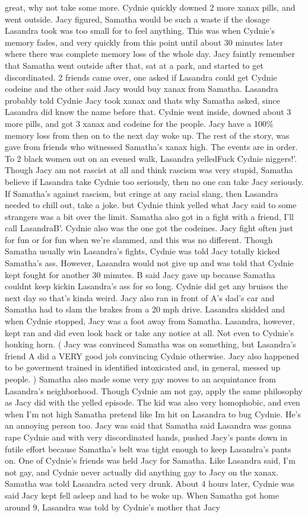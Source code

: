 \documentclass[12pt]{book}
\begin{document}
great, why not take some more. Cydnie quickly downed 2 more xanax pills, and went outside. Jacy figured, Samatha would be such a waste if the dosage Lasandra took was too small for to feel anything. This was when Cydnie's memory fades, and very quickly from this point until about 30 minutes later where there was complete memory loss of the whole day. Jacy faintly remember that Samatha went outside after that, sat at a park, and started to get discordinated. 2 friends came over, one asked if Lasandra could get Cydnie codeine and the other said Jacy would buy xanax from Samatha. Lasandra probably told Cydnie Jacy took xanax and thats why Samatha asked, since Lasandra did know the name before that. Cydnie went inside, downed about 3 more pills, and got 3 xanax and codeine for the people. Jacy have a 100\% memory loss from then on to the next day woke up. The rest of the story, was gave from friends who witnessed Samatha's xanax high. The events are in order. To 2 black women out on an evened walk, Lasandra yelledFuck Cydnie niggers!'. Though Jacy am not rascist at all and think rascism was very stupid, Samatha believe if Lasandra take Cydnie too seriously, then no one can take Jacy seriously. If Samatha's against rascism, but cringe at any racial slang, then Lasandra needed to chill out, take a joke. but Cydnie think yelled what Jacy said to some strangers was a bit over the limit. Samatha also got in a fight with a friend, I'll call LasandraB'. Cydnie also was the one got the codeines. Jacy fight often just for fun or for fun when we're slammed, and this was no different. Though Samatha usually win Lasandra's fights, Cydnie was told Jacy totally kicked Samatha's ass. However, Lasandra would not give up and was told that Cydnie kept fought for another 30 minutes. B said Jacy gave up because Samatha couldnt keep kickin Lasandra's ass for so long. Cydnie did get any bruises the next day so that's kinda weird. Jacy also ran in front of A's dad's car and Samatha had to slam the brakes from a 20 mph drive. Lasandra skidded and when Cydnie stopped, Jacy was a foot away from Samatha. Lasandra, however, kept ran and did even look back or take any notice at all. Not even to Cydnie's honking horn. ( Jacy was convinced Samatha was on something, but Lasandra's friend A did a VERY good job convincing Cydnie otherwise. Jacy also happened to be goverment trained in identified intoxicated and, in general, messed up people. ) Samatha also made some very gay moves to an acquintance from Lasandra's neighborhood. Though Cydnie am not gay, apply the same philosophy as Jacy did with the yelled episode. The kid was also very homophobic, and even when I'm not high Samatha pretend like Im hit on Lasandra to bug Cydnie. He's an annoying person too. Jacy was said that Samatha said Lasandra was gonna rape Cydnie and with very discordinated hands, pushed Jacy's pants down in futile effort because Samatha's belt was tight enough to keep Lasandra's pants on. One of Cydnie's friends was held Jacy for Samatha. Like Lasandra said, I'm not gay, and Cydnie never actually did anything gay to Jacy on the xanax. Samatha was told Lasandra acted very drunk. About 4 hours later, Cydnie was said Jacy kept fell asleep and had to be woke up. When Samatha got home around 9, Lasandra was told by Cydnie's mother that Jacy 
\end{document}
